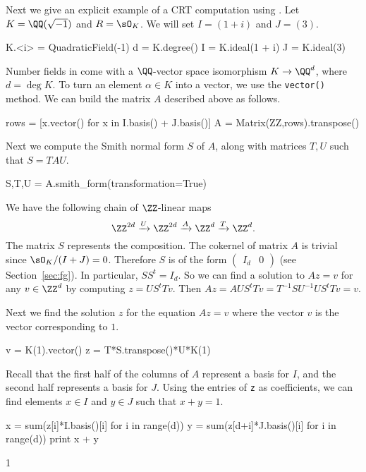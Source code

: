 Next we give an explicit example of a CRT computation using {\Sage}. Let $K = \QQ(\sqrt{-1})$ and $R = \sO_K$. We will set $I = (1 + i)$ and $J = (3)$.
\begin{sagecode}
\begin{sagecell}
K.<i> = QuadraticField(-1)
d = K.degree()
I = K.ideal(1 + i)
J = K.ideal(3)
\end{sagecell}
\end{sagecode} %

Number fields in {\Sage} come with a $\QQ$-vector space isomorphism $K \to \QQ^d$,
where $d = \deg K$.
To turn an element $\alpha \in K$ into a vector, we use the {\tt vector()} method.
We can build the matrix $A$ described above as follows.
\begin{sagecode} %
\begin{sagecell}
rows = [x.vector() for x in I.basis() + J.basis()]
A = Matrix(ZZ,rows).transpose()
\end{sagecell}
\end{sagecode} %
Next we compute the Smith normal form $S$ of $A$,
along with matrices $T,U$ such that $S = TAU$.
\begin{sagecode} %
\begin{sagecell}
S,T,U = A.smith_form(transformation=True)
\end{sagecell}
\end{sagecode} %

We have the following chain of $\ZZ$-linear maps
$$
	\ZZ^{2d} \xrightarrow{U} \ZZ^{2d} \xrightarrow{A} \ZZ^d \xrightarrow{T} \ZZ^d.
$$
The matrix $S$ represents the composition.
The cokernel of matrix $A$ is trivial since $\sO_K/(I + J) = 0$.
Therefore $S$ is of the form $\begin{pmatrix} I_d & 0 \end{pmatrix}$
(see Section~\ref{sec:fg}).
In particular, $SS^t = I_d$.
So we can find a solution to $Az = v$ for any $v \in \ZZ^d$
by computing $z = US^tTv$. Then $Az = AUS^tTv = T^{-1}SU^{-1}US^tTv = v$.

Next we find the solution $z$ for the equation $Az = v$
where the vector $v$ is the vector corresponding to $1$.
\begin{sagecode} %
\begin{sagecell}
v = K(1).vector()
z = T*S.transpose()*U*K(1)
\end{sagecell}
\end{sagecode} %
Recall that the first half of the columns of $A$ represent a basis for $I$,
and the second half represents a basis for $J$.
Using the entries of {\tt z} as coefficients, we can find elements
$x \in I$ and $y \in J$ such that $x + y = 1$.
\begin{sagecode} %
\begin{sagecell}
x = sum(z[i]*I.basis()[i] for i in range(d))
y = sum(z[d+i]*J.basis()[i] for i in range(d))
print x + y
\end{sagecell}
\begin{sageout}
1
\end{sageout}
\end{sagecode} %

